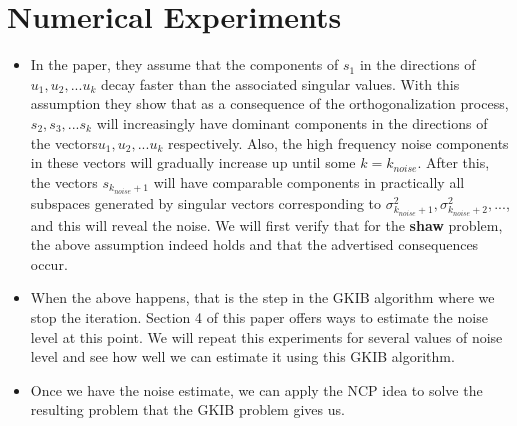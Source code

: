 \documentclass[11pt]{amsart}
\begin{document}
\section{Numerical Experiments}
\begin{itemize}
\item 
In the paper, they assume that the components of $s_1$ in the directions of $u_1,u_2,...u_k$ decay faster than the associated singular values. With this assumption they show that as a consequence of the orthogonalization process, $s_2,s_3,...s_k$ will increasingly have dominant components in the directions of the vectors$u_1,u_2,...u_k$ respectively. Also, the high frequency noise components in these vectors will gradually increase up until some $k=k_{noise}$. After this, the vectors $s_{k_{noise}+1}$ will have comparable components in practically all subspaces generated by singular vectors corresponding to $\sigma^2_{k_{noise}+1},\sigma^2_{k_{noise}+2},...$, and this will reveal the noise. We will first verify that for the {\bf shaw} problem, the above assumption indeed holds and that the advertised consequences occur. 

\item 
When the above happens, that is the step in the GKIB algorithm where we stop the iteration. Section 4 of this paper offers ways to estimate the noise level at this point. We will repeat this experiments for several values of noise level and see how well we can estimate it using this GKIB algorithm.

\item
Once we have the noise estimate, we can apply the NCP idea to solve the resulting problem that the GKIB problem gives us. 

\end{itemize}
\end{document}
